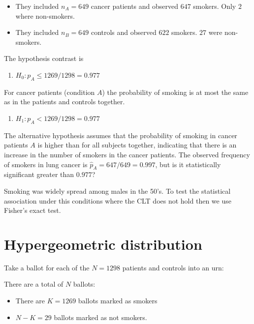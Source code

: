\documentclass[
]{book}
\providecommand{\tightlist}{%
  \setlength{\itemsep}{0pt}\setlength{\parskip}{0pt}}
\begin{document}
\begin{itemize}
\item
  They included \(n_A=649\) cancer patients and observed \(647\) smokers. Only \(2\) where non-smokers.
\item
  They included \(n_B=649\) controls and observed \(622\) smokers. \(27\) were non-smokers.
\end{itemize}

The hypothesis contrast is

\begin{enumerate}
\def\labelenumi{\alph{enumi}.}
\tightlist
\item
  \(H_0: p_A \leq 1269/1298=0.977\)
\end{enumerate}

For cancer patients (condition \(A\)) the probability of smoking is at most the same as in the patients and controls together.

\begin{enumerate}
\def\labelenumi{\alph{enumi}.}
\setcounter{enumi}{1}
\tightlist
\item
  \(H_1: p_A < 1269/1298=0.977\)
\end{enumerate}

The alternative hypothesis assumes that the probability of smoking in cancer patients \(A\) is higher than for all subjects together, indicating that there is an increase in the number of smokers in the cancer patients. The observed frequency of smokers in lung cancer is \(\hat{p}_A=647/649=0.997\), but is it statistically significant greater than \(0.977\)?

Smoking was widely spread among males in the 50's. To test the statistical association under this conditions where the CLT does not hold then we use Fisher's exact test.

\hypertarget{hypergeometric-distribution}{%
\section{Hypergeometric distribution}\label{hypergeometric-distribution}}

Take a ballot for each of the \(N=1298\) patients and controls into an urn:

There are a total of \(N\) ballots:

\begin{itemize}
\tightlist
\item
  There are \(K=1269\) ballots marked as smokers
\item
  \(N-K=29\) ballots marked as not smokers.
\end{itemize}
\end{document}
